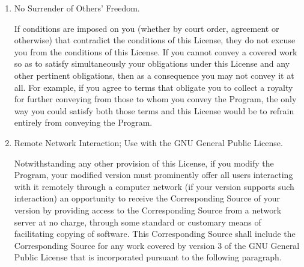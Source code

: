 \documentclass[11pt]{article}
\begin{document}
\begin{enumerate}
A patent license is ``discriminatory'' if it does not include within
the scope of its coverage, prohibits the exercise of, or is
conditioned on the non-exercise of one or more of the rights that are
specifically granted under this License.  You may not convey a covered
work if you are a party to an arrangement with a third party that is
in the business of distributing software, under which you make payment
to the third party based on the extent of your activity of conveying
the work, and under which the third party grants, to any of the
parties who would receive the covered work from you, a discriminatory
patent license (a) in connection with copies of the covered work
conveyed by you (or copies made from those copies), or (b) primarily
for and in connection with specific products or compilations that
contain the covered work, unless you entered into that arrangement,
or that patent license was granted, prior to 28 March 2007.

Nothing in this License shall be construed as excluding or limiting
any implied license or other defenses to infringement that may
otherwise be available to you under applicable patent law.

\item No Surrender of Others' Freedom.

If conditions are imposed on you (whether by court order, agreement or
otherwise) that contradict the conditions of this License, they do not
excuse you from the conditions of this License.  If you cannot convey a
covered work so as to satisfy simultaneously your obligations under this
License and any other pertinent obligations, then as a consequence you may
not convey it at all.  For example, if you agree to terms that obligate you
to collect a royalty for further conveying from those to whom you convey
the Program, the only way you could satisfy both those terms and this
License would be to refrain entirely from conveying the Program.

\item Remote Network Interaction; Use with the GNU General Public License.

Notwithstanding any other provision of this License, if you modify the
Program, your modified version must prominently offer all users interacting
with it remotely through a computer network (if your version supports such
interaction) an opportunity to receive the Corresponding Source of your
version by providing access to the Corresponding Source from a network
server at no charge, through some standard or customary means of
facilitating copying of software.  This Corresponding Source shall include
the Corresponding Source for any work covered by version 3 of the GNU
General Public License that is incorporated pursuant to the following
paragraph.


\end{enumerate}
\end{document}
